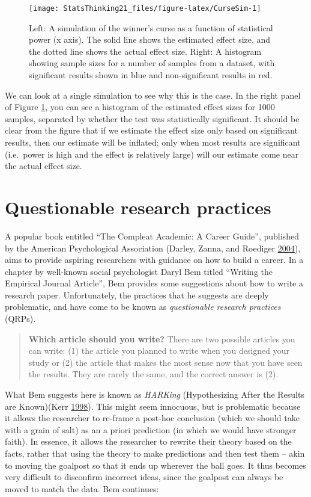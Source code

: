 \documentclass[12pt,]{book}
\theoremstyle{definition}
\theoremstyle{definition}
\theoremstyle{definition}
\theoremstyle{remark}
\begin{document}
\begin{figure}
\texttt{[image: StatsThinking21\_files/figure-latex/CurseSim-1]} \caption{Left: A simulation of the winner's curse as a function of statistical power (x axis). The solid line shows the estimated effect size, and the dotted line shows the actual effect size. Right: A histogram showing sample sizes for a number of samples from a dataset, with significant results shown in blue and non-significant results in red. }\label{fig:CurseSim}
\end{figure}

We can look at a single simulation to see why this is the case. In the right panel of Figure \ref{fig:CurseSim}, you can see a histogram of the estimated effect sizes for 1000 samples, separated by whether the test was statistically significant. It should be clear from the figure that if we estimate the effect size only based on significant results, then our estimate will be inflated; only when most results are significant (i.e.~power is high and the effect is relatively large) will our estimate come near the actual effect size.

\hypertarget{questionable-research-practices}{%
\section{Questionable research practices}\label{questionable-research-practices}}

A popular book entitled ``The Compleat Academic: A Career Guide'', published by the American Psychological Association (Darley, Zanna, and Roediger \protect\hyperlink{ref-darl:zann:roed:2004}{2004}), aims to provide aspiring researchers with guidance on how to build a career. In a chapter by well-known social psychologist Daryl Bem titled ``Writing the Empirical Journal Article'', Bem provides some suggestions about how to write a research paper. Unfortunately, the practices that he suggests are deeply problematic, and have come to be known as \emph{questionable research practices} (QRPs).

\begin{quote}
\textbf{Which article should you write?} There are two possible articles you can write: (1) the article you planned to write when you designed your study or (2) the article that makes the most sense now that you have seen the results. They are rarely the same, and the correct answer is (2).
\end{quote}

What Bem suggests here is known as \emph{HARKing} (Hypothesizing After the Results are Known)(Kerr \protect\hyperlink{ref-kerr:1998}{1998}). This might seem innocuous, but is problematic because it allows the researcher to re-frame a post-hoc conclusion (which we should take with a grain of salt) as an a priori prediction (in which we would have stronger faith). In essence, it allows the researcher to rewrite their theory based on the facts, rather that using the theory to make predictions and then test them -- akin to moving the goalpost so that it ends up wherever the ball goes. It thus becomes very difficult to disconfirm incorrect ideas, since the goalpost can always be moved to match the data. Bem continues:
\end{document}
